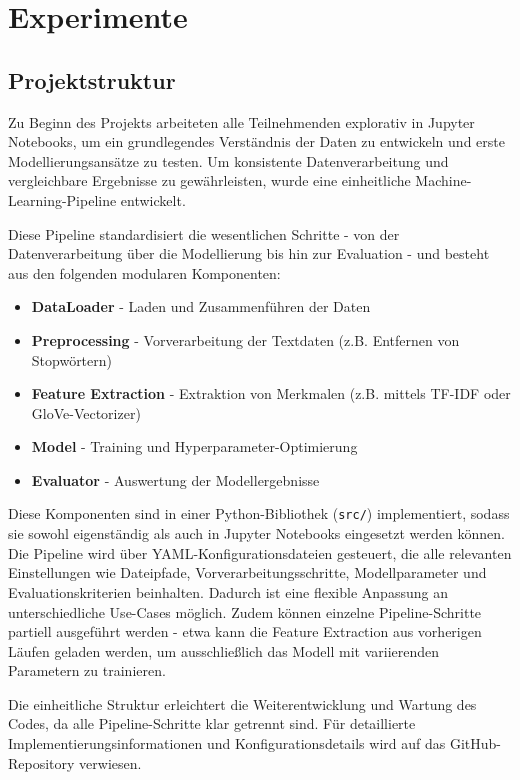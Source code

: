 \section{Experimente}

\subsection{Projektstruktur}
\label{sec:projektstruktur}
Zu Beginn des Projekts arbeiteten alle Teilnehmenden explorativ in Jupyter Notebooks, um ein grundlegendes Verständnis der Daten zu entwickeln und erste Modellierungsansätze zu testen. Um konsistente Datenverarbeitung und vergleichbare Ergebnisse zu gewährleisten, wurde eine einheitliche Machine-Learning-Pipeline entwickelt.

Diese Pipeline standardisiert die wesentlichen Schritte - von der Datenverarbeitung über die Modellierung bis hin zur Evaluation - und besteht aus den folgenden modularen Komponenten:

\begin{itemize}
    \item \textbf{DataLoader} - Laden und Zusammenführen der Daten
    \item \textbf{Preprocessing} - Vorverarbeitung der Textdaten (z.B. Entfernen von Stopwörtern)
    \item \textbf{Feature Extraction} - Extraktion von Merkmalen (z.B. mittels TF-IDF oder GloVe-Vectorizer)
    \item \textbf{Model} - Training und Hyperparameter-Optimierung
    \item \textbf{Evaluator} - Auswertung der Modellergebnisse
\end{itemize}

Diese Komponenten sind in einer Python-Bibliothek (\texttt{src/}) implementiert, sodass sie sowohl eigenständig als auch in Jupyter Notebooks eingesetzt werden können. Die Pipeline wird über YAML-Konfigurationsdateien gesteuert, die alle relevanten Einstellungen wie Dateipfade, Vorverarbeitungsschritte, Modellparameter und Evaluationskriterien beinhalten. Dadurch ist eine flexible Anpassung an unterschiedliche Use-Cases möglich. Zudem können einzelne Pipeline-Schritte partiell ausgeführt werden - etwa kann die Feature Extraction aus vorherigen Läufen geladen werden, um ausschließlich das Modell mit variierenden Parametern zu trainieren.

Die einheitliche Struktur erleichtert die Weiterentwicklung und Wartung des Codes, da alle Pipeline-Schritte klar getrennt sind. Für detaillierte Implementierungsinformationen und Konfigurationsdetails wird auf das GitHub-Repository verwiesen.

